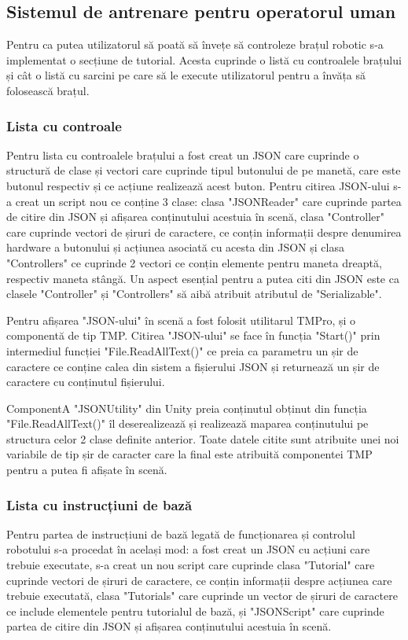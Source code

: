 \subsection{Sistemul de antrenare pentru operatorul uman}
Pentru ca putea utilizatorul să poată să învețe să controleze brațul robotic s-a implementat o secțiune de tutorial. Acesta cuprinde o listă cu controalele brațului și cât o listă cu sarcini pe care să le execute utilizatorul pentru a învăța să folosească brațul.

\subsubsection{Lista cu controale}

Pentru lista cu controalele brațului a fost creat un JSON care cuprinde o structură de clase și vectori care cuprinde tipul butonului de pe manetă, care este butonul respectiv și ce acțiune realizează acest buton. Pentru citirea JSON-ului s-a creat un script nou ce conține 3 clase: clasa  "JSONReader" care cuprinde partea de citire din JSON și afișarea conținutului acestuia în scenă, clasa "Controller" care cuprinde vectori de șiruri de caractere, ce conțin informații despre denumirea hardware a butonului și acțiunea asociată cu acesta din JSON și clasa "Controllers" ce cuprinde 2 vectori ce conțin elemente pentru maneta dreaptă, respectiv maneta stângă. Un aspect esențial pentru a putea citi din JSON este ca clasele "Controller" și "Controllers" să aibă atribuit atributul de "Serializable".

Pentru afișarea "JSON-ului" în scenă a fost folosit utilitarul TMPro, și o componentă de tip TMP.
Citirea "JSON-ului" se face în funcția "Start()" prin intermediul funcției "File.ReadAllText()" ce preia  ca parametru un șir de caractere ce conține calea din sistem a fișierului JSON și returnează un șir de caractere cu conținutul fișierului.

 ComponentA "JSONUtility" din Unity preia conținutul obținut din funcția  "File.ReadAllText()" îl deserealizează și realizează maparea conținutului pe structura celor 2 clase definite anterior. Toate datele citite sunt atribuite unei noi variabile de tip șir de caracter care la final este atribuită componentei TMP pentru a putea fi afișate în scenă.
 
 \subsubsection{Lista cu instrucțiuni de bază}
 Pentru partea de instrucțiuni de bază legată de funcționarea și controlul robotului s-a procedat în același mod: a fost creat un JSON cu acțiuni care trebuie executate, s-a creat un nou script care cuprinde clasa "Tutorial" care cuprinde vectori de șiruri de caractere, ce conțin informații despre acțiunea care trebuie executată, clasa "Tutorials" care cuprinde un vector de șiruri de caractere ce include elementele pentru tutorialul de bază, și "JSONScript" care cuprinde partea de citire din JSON și afișarea conținutului acestuia în scenă.
 
